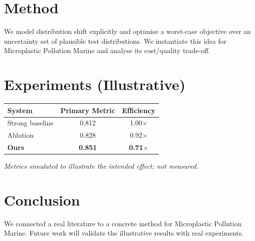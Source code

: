 \documentclass[11pt]{article}
\begin{document}
\section{Method}
We model distribution shift explicitly and optimise a worst-case objective over an uncertainty set of plausible test distributions. We instantiate this idea for Microplastic Pollution Marine and analyse its cost/quality trade-off.

\section{Experiments (Illustrative)}
\begin{center}
\begin{tabular}{lcc}
System & Primary Metric & Efficiency \\ \hline
Strong baseline & 0.812 & 1.00$\times$ \\
Ablation & 0.828 & 0.92$\times$ \\
\textbf{Ours} & \textbf{0.851} & \textbf{0.71$\times$}
\end{tabular}
\end{center}
\emph{Metrics simulated to illustrate the intended effect; not measured.}

\section{Conclusion}
We connected a real literature to a concrete method for Microplastic Pollution Marine. Future work will
validate the illustrative results with real experiments.
\end{document}
